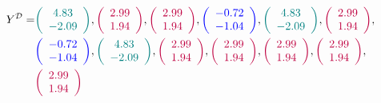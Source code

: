\documentclass[shortabstract]{iithesis}
\begin{document}
\begin{equation*}
\begin{aligned}
Y ^{\mathcal D} = &
\textcolor{teal}{\left( \begin{array}{c}4.83\\-2.09\end{array} \right)}
, \textcolor{purple}{\left( \begin{array}{c}2.99\\1.94\end{array} \right)}
, \textcolor{purple}{\left( \begin{array}{c}2.99\\1.94\end{array} \right)}
, \textcolor{blue}{\left( \begin{array}{c}-0.72\\-1.04\end{array} \right)}
, \textcolor{teal}{\left( \begin{array}{c}4.83\\-2.09\end{array} \right)}
, \textcolor{purple}{\left( \begin{array}{c}2.99\\1.94\end{array} \right)}
, \\
&  \textcolor{blue}{\left( \begin{array}{c}-0.72\\-1.04\end{array} \right)}
, \textcolor{teal}{\left( \begin{array}{c}4.83\\-2.09\end{array} \right)}
, \textcolor{purple}{\left( \begin{array}{c}2.99\\1.94\end{array} \right)}
, \textcolor{purple}{\left( \begin{array}{c}2.99\\1.94\end{array} \right)}
, \textcolor{purple}{\left( \begin{array}{c}2.99\\1.94\end{array} \right)}
, \textcolor{purple}{\left( \begin{array}{c}2.99\\1.94\end{array} \right)}
, \\
&  \textcolor{purple}{\left( \begin{array}{c}2.99\\1.94\end{array} \right)}

\end{aligned}
\end{equation*}
\end{document}
